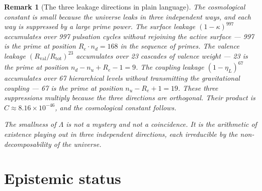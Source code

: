 \documentclass[12pt,a4paper]{article}
\newtheorem{remark}[theorem]{Remark}
\newcommand{\Rtot}{R_{\mathrm{tot}}}
\newcommand{\Rval}{R_{\mathrm{val}}}
\newcommand{\kap}{\kappa}
\newcommand{\etaL}{\eta_L}
\begin{document}
\begin{remark}[The three leakage directions in plain language]
The cosmological constant is small because the universe leaks in three independent ways, and each way is suppressed by a large prime power. The surface leakage $(1-\kap)^{997}$ accumulates over 997 pulsation cycles without rejoining the active surface — 997 is the prime at position $R_e \cdot n_d = 168$ in the sequence of primes. The valence leakage $(\Rval/\Rtot)^{23}$ accumulates over 23 cascades of valence weight — 23 is the prime at position $n_d - n_u + R_e - 1 = 9$. The coupling leakage $(1-\etaL)^{67}$ accumulates over 67 hierarchical levels without transmitting the gravitational coupling — 67 is the prime at position $n_u - R_e + 1 = 19$. These three suppressions multiply because the three directions are orthogonal. Their product is $C \approx 8.16 \times 10^{-46}$, and the cosmological constant follows.

The smallness of $\Lambda$ is not a mystery and not a coincidence. It is the arithmetic of existence playing out in three independent directions, each irreducible by the non-decomposability of the universe.
\end{remark}

\section{Epistemic status}
\label{sec:epistemic}
\end{document}
